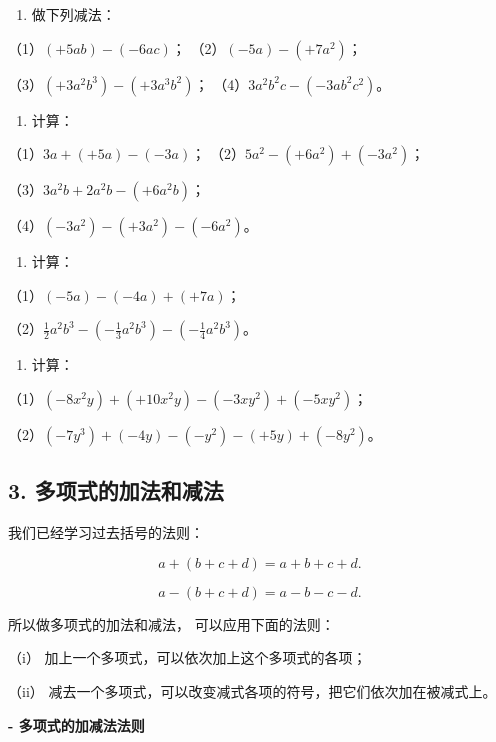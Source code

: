 \begin{enumerate}[start=2]
\item
  做下列减法：
\end{enumerate}

（1）\((+5ab) - (-6ac)\)； （2）\((-5a) - (+7a^2)\)；

（3）\((+3a^{2}b^{3}) - (+3a^{3}b^{2})\)；
（4）\(3a^{2}b^{2}c - (-3ab^{2}c^{2})\)。

\begin{enumerate}[start=3]
\item
  计算：
\end{enumerate}

（1）\(3a + (+5a) - (-3a)\)； （2）\(5a^2 - (+6a^2) + (-3a^2)\)；

（3）\(3a^{2}b + 2a^{2}b - (+6a^{2}b)\)；

（4）\((-3a^{2}) - (+3a^{2}) - (-6a^{2})\)。

\begin{enumerate}[start=4]
\item
  计算：
\end{enumerate}

（1）\((-5a) - (-4a) + (+7a)\)；

（2）\(\frac{1}{2} a^2 b^3 - \left(-\frac{1}{3} a^2 b^3\right) - \left(-\frac{1}{4} a^2 b^3\right)\)。

\begin{enumerate}[start=5]
\item
  计算：
\end{enumerate}

（1）\((-8x^{2}y) + (+10x^{2}y) - (-3xy^{2}) + (-5xy^{2})\)；

（2）\((-7y^{3}) + (-4y) - (-y^{2}) - (+5y) + (-8y^{2})\)。

\subsection{3. 多项式的加法和减法}

我们已经学习过去括号的法则：

\[
a + (b + c + d) = a + b + c + d.
\]

\[
a - (b + c + d) = a - b - c - d.
\]

所以做多项式的加法和减法， 可以应用下面的法则：

（i） 加上一个多项式，可以依次加上这个多项式的各项；

（ii） 减去一个多项式，可以改变减式各项的符号，把它们依次加在被减式上。

\textbf{- 多项式的加减法法则}

